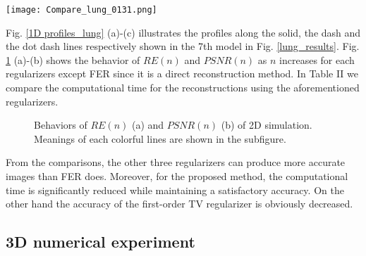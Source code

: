 \documentclass[lettersize,journal]{IEEEtran}
\begin{document}
\begin{figure*}[htbp]
  \centering
  \texttt{[image: Compare\_lung\_0131.png]}\\
  \caption{The reconstruction results for 2D model using four different regularizers. The first row depicts the ground truth conductivity distribution, the second to the fifth row illustrate the reconstruction results using the FER, the TV, the first-order TV and the proposed regularizers. }\label{lung_results}
\end{figure*}

Fig. \ref{1D profiles_lung} (a)-(c) illustrates the profiles along the solid, the dash and the dot dash lines respectively shown in the 7th model in Fig. \ref{lung_results}. Fig. \ref{quantitative indicators_2d_lung} (a)-(b) shows the behavior of $RE(n)$ and $PSNR(n)$ as $n$ increases for each regularizers except FER since it is a direct reconstruction method. In Table II we compare the computational time for the reconstructions using the aforementioned regularizers.

\begin{figure*}[htbp]
\centering
{}
\centering
\caption{Profiles of the reconstructed conductivity along the solid line (a), the slash line (b) and the dot dash line (c) shown in Fig. \ref{lung_results}. The meaning of each colorful lines in (a)-(c) are shown in each subfigure.}
\label{1D profiles_lung}
\end{figure*}

\begin{figure}[h]
\centering
{}
\centering
\caption{Behaviors of $RE(n)$ (a) and $PSNR(n)$ (b) of 2D simulation. Meanings of each colorful lines are shown in the subfigure.}
\label{quantitative indicators_2d_lung}
\end{figure}

From the comparisons, the other three regularizers can produce more accurate images than FER does. Moreover, for the proposed method, the computational time is significantly reduced while maintaining a satisfactory accuracy. On the other hand the accuracy of the first-order TV regularizer is obviously decreased.

\subsection{3D numerical experiment}
\end{document}
